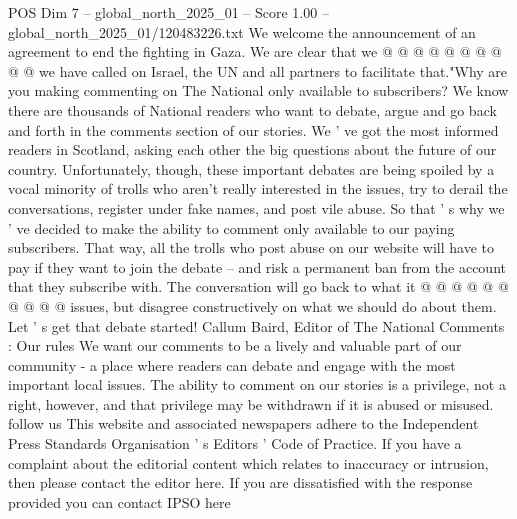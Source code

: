 \begin{textsample}{POS Dim 7 – global\_north\_2025\_01 – Score 1.00 – global\_north\_2025\_01/120483226.txt}
We welcome the announcement of an agreement to end the fighting in Gaza.
We are clear that we @ @ @ @ @ @ @ @ @ @ we have called on Israel, the UN and all partners to facilitate that."Why are you making commenting on The National only available to subscribers?
We know there are thousands of National readers who want to debate, argue and go back and forth in the comments section of our stories.
We ' ve got the most informed readers in Scotland, asking each other the big questions about the future of our country.
Unfortunately, though, these important debates are being spoiled by a vocal minority of trolls who aren't really interested in the issues, try to derail the conversations, register under fake names, and post vile abuse.
So that ' s why we ' ve decided to make the ability to comment only available to our paying subscribers.
That way, all the trolls who post abuse on our website will have to pay if they want to join the debate -- and risk a permanent ban from the account that they subscribe with.
The conversation will go back to what it @ @ @ @ @ @ @ @ @ @ issues, but disagree constructively on what we should do about them.
Let ' s get that debate started!
Callum Baird, Editor of The National Comments : Our rules We want our comments to be a lively and valuable part of our community - a place where readers can debate and engage with the most important local issues.
The ability to comment on our stories is a privilege, not a right, however, and that privilege may be withdrawn if it is abused or misused. follow us This website and associated newspapers adhere to the Independent Press Standards Organisation ' s Editors ' Code of Practice.
If you have a complaint about the editorial content which relates to inaccuracy or intrusion, then please contact the editor here.
If you are dissatisfied with the response provided you can contact IPSO here

\end{textsample}
